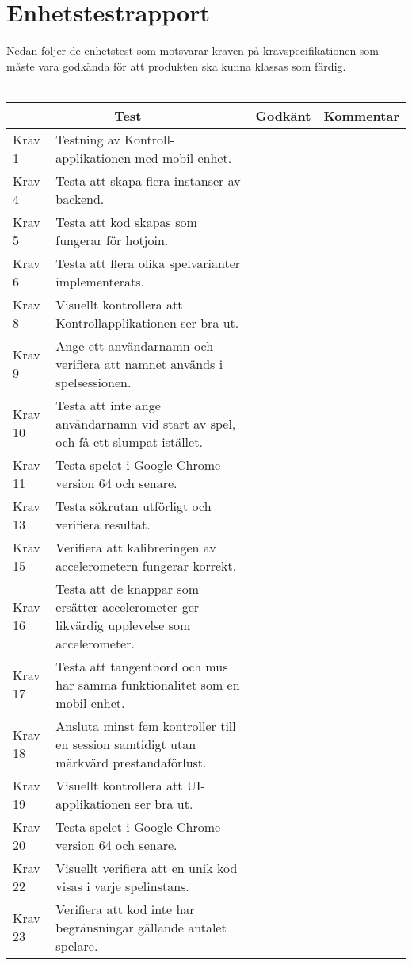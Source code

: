 \documentclass[10pt]{article}
\begin{document}
\section{Enhetstestrapport}
	Nedan följer de enhetstest som motsvarar kraven på kravspecifikationen \cite{bib-kravspec} som måste vara godkända för att produkten ska kunna klassas som färdig.
\\ \\
\noindent
\begin{tabular}{| p{1.5cm} | p{5cm} | p{1.2cm}| p{7cm}|}
	
	\hline
	\multicolumn{2}{|c|}{Test}&{Godkänt}&{Kommentar}\\
    	\hline
    
		Krav 1&Testning av Kontroll-applikationen med mobil enhet.&&\\
		\hline
		Krav 4& Testa att skapa flera instanser av backend.&&\\
		\hline
		Krav 5&Testa att kod skapas som fungerar för hotjoin.&&\\
		\hline
		Krav 6&Testa att flera olika spelvarianter implementerats.&&\\
		\hline
		Krav 8&Visuellt kontrollera att Kontrollapplikationen ser bra ut.&&\\
		\hline
		Krav 9&Ange ett användarnamn och verifiera att namnet används i spelsessionen.&&\\
		\hline
		Krav 10&Testa att inte ange användarnamn vid start av spel, och få ett slumpat istället.&& \\
		\hline
		Krav 11&Testa spelet i Google Chrome version 64 och senare.&&\\
		\hline
		Krav 13&Testa sökrutan utförligt och verifiera resultat.&& \\
		\hline
		Krav 15&Verifiera att kalibreringen av accelerometern fungerar korrekt.&&\\
		\hline
		Krav 16&Testa att de knappar som ersätter accelerometer ger likvärdig upplevelse som accelerometer.&&\\
		\hline
		Krav 17&Testa att tangentbord och mus har samma funktionalitet som en mobil enhet.&&\\
		\hline
		Krav 18&Ansluta minst fem kontroller till en session samtidigt utan märkvärd prestandaförlust.&&\\
		\hline
		Krav 19&Visuellt kontrollera att UI-applikationen ser bra ut.&&\\
		\hline
		Krav 20&Testa spelet i Google Chrome version 64 och senare. &&\\
		\hline
		Krav 22&Visuellt verifiera att en unik kod visas i varje spelinstans.&&\\
		\hline
		Krav 23&Verifiera att kod inte har begränsningar gällande antalet spelare.&& \\
		\hline


   
  \end{tabular}
  \\
  \\
  
\end{document}
